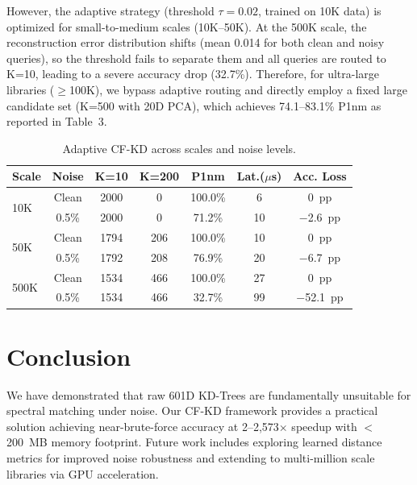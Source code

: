 \documentclass[final,5p,times]{elsarticle}
\begin{document}
However, the adaptive strategy (threshold $\tau=0.02$, trained on 10K data) is optimized for small-to-medium scales (10K--50K). At the 500K scale, the reconstruction error distribution shifts (mean 0.014 for both clean and noisy queries), so the threshold fails to separate them and all queries are routed to K=10, leading to a severe accuracy drop (32.7\%). Therefore, for ultra-large libraries ($\geq$100K), we bypass adaptive routing and directly employ a fixed large candidate set (K=500 with 20D PCA), which achieves 74.1--83.1\% P1nm as reported in Table~3.

\begin{table}[H]
\centering
\caption{Adaptive CF-KD across scales and noise levels.}
\label{tab:adaptive}
\begin{tabular}{lcccccc}
\toprule
Scale & Noise & K=10 & K=200 & P1nm & Lat.($\mu$s) & Acc. Loss \\
\midrule
\multirow{2}{*}{10K} & Clean & 2000 & 0 & 100.0\% & 6 & 0~pp \\
 & 0.5\% & 2000 & 0 & 71.2\% & 10 & $-$2.6~pp \\
\midrule
\multirow{2}{*}{50K} & Clean & 1794 & 206 & 100.0\% & 10 & 0~pp \\
 & 0.5\% & 1792 & 208 & 76.9\% & 20 & $-$6.7~pp \\
\midrule
\multirow{2}{*}{500K} & Clean & 1534 & 466 & 100.0\% & 27 & 0~pp \\
 & 0.5\% & 1534 & 466 & 32.7\% & 99 & $-$52.1~pp \\
\bottomrule
\end{tabular}
\end{table}

\clearpage

\section{Conclusion}
\label{sec:conclusion}

We have demonstrated that raw 601D KD-Trees are fundamentally unsuitable for spectral matching under noise. Our CF-KD framework provides a practical solution achieving near-brute-force accuracy at 2--2,573$\times$ speedup with $<$200~MB memory footprint. Future work includes exploring learned distance metrics for improved noise robustness and extending to multi-million scale libraries via GPU acceleration.
\end{document}
